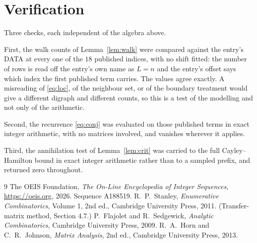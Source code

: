 \documentclass[11pt,a4paper]{article}
\theoremstyle{plain}
\theoremstyle{definition}
\begin{document}
\section{Verification}

Three checks, each independent of the algebra above.

First, the walk counts of Lemma~\ref{lem:walk} were compared against the entry's DATA at
every one of the $18$ published indices, with no shift fitted: the number of rows is
read off the entry's own name as $L=n$ and the entry's offset says which index the first
published term carries. The values agree exactly. A misreading of \eqref{eq:loc}, of the
neighbour set, or of the boundary treatment would give a different digraph and different
counts, so this is a test of the modelling and not only of the arithmetic.

Second, the recurrence \eqref{eq:conj} was evaluated on those published terms in exact
integer arithmetic, with no matrices involved, and vanishes wherever it applies.

Third, the annihilation test of Lemma~\ref{lem:crit} was carried to the full
Cayley--Hamilton bound in exact integer arithmetic rather than to a sampled prefix, and
returned zero throughout.

\begin{thebibliography}{9}
 The OEIS Foundation, \emph{The On-Line Encyclopedia of Integer
Sequences}, \url{https://oeis.org}, 2026. Sequence A188519.
 R.~P.~Stanley, \emph{Enumerative Combinatorics}, Volume 1, 2nd ed.,
Cambridge University Press, 2011. (Transfer-matrix method, Section 4.7.)
 P.~Flajolet and R.~Sedgewick, \emph{Analytic Combinatorics}, Cambridge
University Press, 2009.
 R.~A.~Horn and C.~R.~Johnson, \emph{Matrix Analysis}, 2nd ed., Cambridge
University Press, 2013.
\end{thebibliography}
\end{document}
